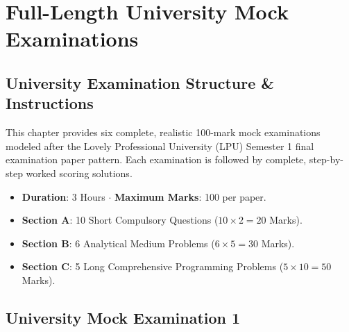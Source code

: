 \chapter{Full-Length University Mock Examinations}
\label{chap:mock-examinations}

\section{University Examination Structure \& Instructions}

This chapter provides six complete, realistic 100-mark mock examinations modeled after the Lovely Professional University (LPU) Semester 1 final examination paper pattern. Each examination is followed by complete, step-by-step worked scoring solutions.

\begin{conceptbox}
\begin{itemize}[leftmargin=1.5em]
    \item \textbf{Duration}: 3 Hours $\cdot$ \textbf{Maximum Marks}: 100 per paper.
    \item \textbf{Section A}: 10 Short Compulsory Questions ($10 \times 2 = 20$ Marks).
    \item \textbf{Section B}: 6 Analytical Medium Problems ($6 \times 5 = 30$ Marks).
    \item \textbf{Section C}: 5 Long Comprehensive Programming Problems ($5 \times 10 = 50$ Marks).
\end{itemize}
\end{conceptbox}

\section{University Mock Examination 1}

